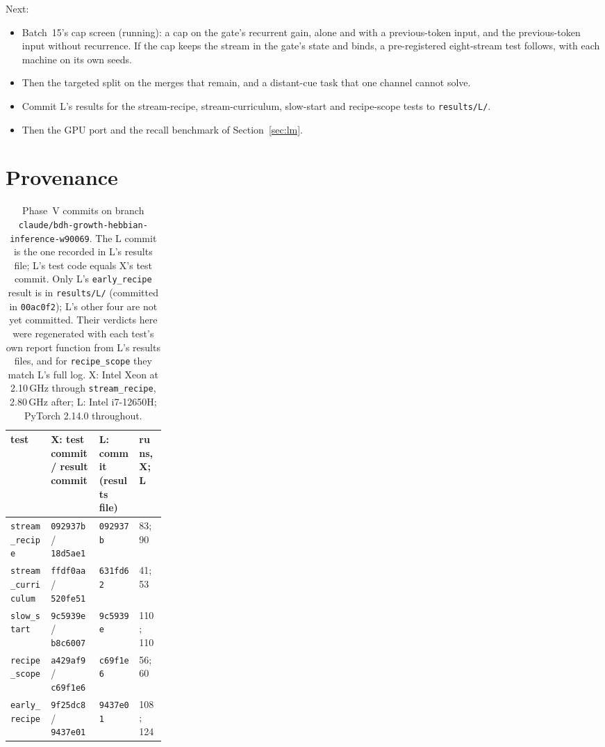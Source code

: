 \documentclass[11pt]{article}
\begin{document}
Next:
\begin{itemize}
\item Batch~15's cap screen (running): a cap on the gate's recurrent gain, alone and with a previous-token input, and the previous-token input without recurrence. If the cap keeps the stream in the gate's state and binds, a pre-registered eight-stream test follows, with each machine on its own seeds.
\item Then the targeted split on the merges that remain, and a distant-cue task that one channel cannot solve.
\item Commit L's results for the stream-recipe, stream-curriculum, slow-start and recipe-scope tests to \texttt{results/L/}.
\item Then the GPU port and the recall benchmark of Section~\ref{sec:lm}.
\end{itemize}

\appendix
\section{Provenance}
\label{app:prov}

\begin{table}[H]
\centering
\footnotesize
\begin{tabular}{@{}>{\raggedright\arraybackslash}p{0.26\linewidth}lll@{}}
\toprule
test & X: test commit / result commit & L: commit (results file) & runs, X; L\\
\midrule
\texttt{stream\_recipe} & \texttt{092937b} / \texttt{18d5ae1} & \texttt{092937b} & 83; 90\\
\texttt{stream\_curriculum} & \texttt{ffdf0aa} / \texttt{520fe51} & \texttt{631fd62} & 41; 53\\
\texttt{slow\_start} & \texttt{9c5939e} / \texttt{b8c6007} & \texttt{9c5939e} & 110; 110\\
\texttt{recipe\_scope} & \texttt{a429af9} / \texttt{c69f1e6} & \texttt{c69f1e6} & 56; 60\\
\texttt{early\_recipe} & \texttt{9f25dc8} / \texttt{9437e01} & \texttt{9437e01} & 108; 124\\
\bottomrule
\end{tabular}
\caption{Phase~V commits on branch \texttt{claude/bdh-growth-hebbian-inference-w90069}. The L commit is the one recorded in L's results file; L's test code equals X's test commit. Only L's \texttt{early\_recipe} result is in \texttt{results/L/} (committed in \texttt{00ac0f2}); L's other four are not yet committed. Their verdicts here were regenerated with each test's own report function from L's results files, and for \texttt{recipe\_scope} they match L's full log. X: Intel Xeon at 2.10\,GHz through \texttt{stream\_recipe}, 2.80\,GHz after; L: Intel i7-12650H; PyTorch 2.14.0 throughout.}
\label{tab:prov}
\end{table}
\end{document}
